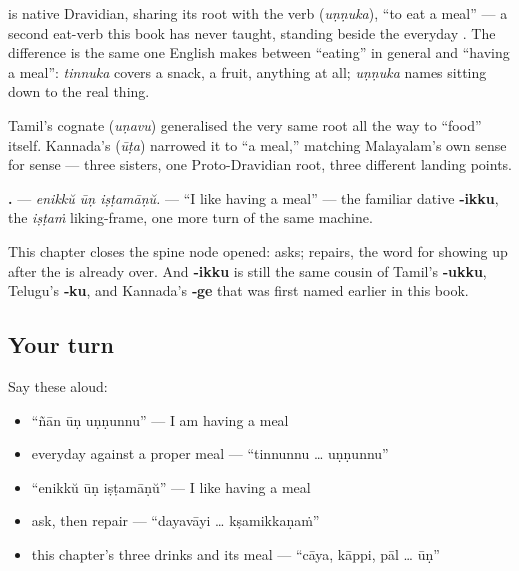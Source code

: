 \begin{cousinweb}
\textbf{} is native Dravidian, sharing its root with the verb \textbf{} (\emph{uṇṇuka}), \textquotedblleft{}to eat a meal\textquotedblright{} — a second eat-verb this book has never taught, standing beside the everyday \textbf{}. The difference is the same one English makes between \textquotedblleft{}eating\textquotedblright{} in general and \textquotedblleft{}having a meal\textquotedblright{}: \emph{tinnuka} covers a snack, a fruit, anything at all; \emph{uṇṇuka} names sitting down to the real thing.

Tamil's cognate \textbf{} (\emph{uṇavu}) generalised the very same root all the way to \textquotedblleft{}food\textquotedblright{} itself. Kannada's \textbf{} (\emph{ūṭa}) narrowed it to \textquotedblleft{}a meal,\textquotedblright{} matching Malayalam's own \textbf{} sense for sense — three sisters, one Proto-Dravidian root, three different landing points.
\end{cousinweb}

\begin{grammarlens}[title={Grammar Lens: the stretch this chapter closes}]
\textbf{  .} — \emph{enikkŭ ūṇ iṣṭamāṇŭ.} — \textquotedblleft{}I like having a meal\textquotedblright{} — the familiar dative \textbf{‑ikku}, the \emph{iṣṭaṁ} liking-frame, one more turn of the same machine.

This chapter closes the spine node \textbf{} opened: \textbf{} asks; \textbf{} repairs, the word for showing up after the \textbf{} is already over. And \textbf{‑ikku} is still the same cousin of Tamil's \textbf{‑ukku}, Telugu's \textbf{‑ku}, and Kannada's \textbf{‑ge} that was first named earlier in this book.
\end{grammarlens}

\subsection*{Your turn}
Say these aloud:

\begin{itemize}
\raggedright
  \item \textquotedblleft{}ñān ūṇ uṇṇunnu\textquotedblright{} — I am having a meal
  \item everyday against a proper meal — \textquotedblleft{}tinnunnu … uṇṇunnu\textquotedblright{}
  \item \textquotedblleft{}enikkŭ ūṇ iṣṭamāṇŭ\textquotedblright{} — I like having a meal
  \item ask, then repair — \textquotedblleft{}dayavāyi … kṣamikkaṇaṁ\textquotedblright{}
  \item this chapter's three drinks and its meal — \textquotedblleft{}cāya, kāppi, pāl … ūṇ\textquotedblright{}
\end{itemize}

